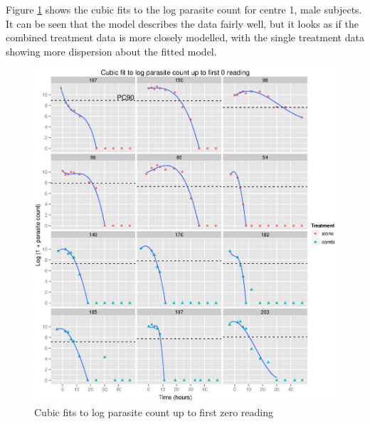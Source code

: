 Figure \ref{cubics} shows the cubic fits to the log parasite count for centre 1, male subjects. It can be seen that the model describes the data fairly well, but it looks as if the combined treatment data is more closely modelled, with the single treatment data showing more dispersion about the fitted model. 
\begin{figure}[p]
\includegraphics[width=150mm]{cubics.eps} 
\caption{Cubic fits to log parasite count up to first zero reading}\label{cubics}
\end{figure}


